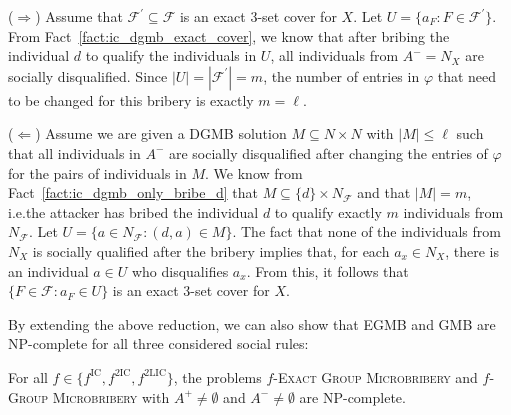 \documentclass[
    12pt,               %
    a4paper,            %
    bibtotoc,           %
    pointlessnumbers,   %
    ngerman,            %
    titlepage,          %
    leqno,              %
    ]{scrarticle}       %
\newcommand\factref{Fact~\ref}
\begin{document}
\begin{Proof}
($\Rightarrow$) Assume that $\mathcal{F}^\prime \subseteq \mathcal{F}$ is an exact 3-set cover for $X$. Let $U = \{ a_F : F \in \mathcal{F}^\prime \}$. From \factref{fact:ic_dgmb_exact_cover}, we know that after bribing the individual $d$ to qualify the individuals in $U$, all individuals from $A^- = N_X$ are socially disqualified. Since $|U| = |\mathcal{F}^\prime| = m$, the number of entries in $\varphi$ that need to be changed for this bribery is exactly $m = \ell$.

($\Leftarrow$) Assume we are given a DGMB solution $M \subseteq N \times N$ with $|M| \leq \ell$ such that all individuals in $A^-$ are socially disqualified after changing the entries of $\varphi$ for the pairs of individuals in $M$. We know from \factref{fact:ic_dgmb_only_bribe_d} that $M \subseteq \{d\} \times N_\mathcal{F}$ and that $|M| = m$, i.e.\@ the attacker has bribed the individual $d$ to qualify exactly $m$ individuals from $N_\mathcal{F}$. Let $U = \{ a \in N_\mathcal{F} : (d, a) \in M \}$. The fact that none of the individuals from $N_X$ is socially qualified after the bribery implies that, for each $a_x \in N_X$, there is an individual $a \in U$ who disqualifies $a_x$. From this, it follows that $\{ F \in \mathcal{F} : a_F \in U \}$ is an exact 3-set cover for $X$.
\end{Proof}



By extending the above reduction, we can also show that EGMB and GMB are NP-complete for all three considered social rules:

\begin{Corollary} \label{cor:ic_egmb_gmb_npc}
For all $f \in \{ f^{\text{IC}}, f^{\text{2IC}}, f^{\text{2LIC}} \}$, the problems $f$-\textsc{Exact Group Microbribery} and $f$-\textsc{Group Microbribery} with $A^+ \neq \emptyset$ and $A^- \neq \emptyset$ are NP-complete.
\end{Corollary}
\end{document}
